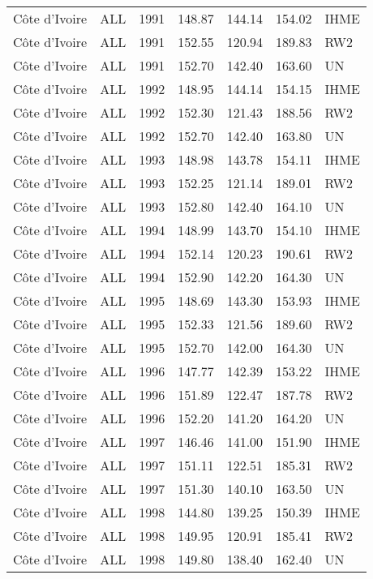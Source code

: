 \begin{longtable}{lllrrrl}
  C\^{o}te d'Ivoire & ALL & 1991 & 148.87 & 144.14 & 154.02 & IHME \\ 
  C\^{o}te d'Ivoire & ALL & 1991 & 152.55 & 120.94 & 189.83 & RW2 \\ 
  C\^{o}te d'Ivoire & ALL & 1991 & 152.70 & 142.40 & 163.60 & UN \\ 
  C\^{o}te d'Ivoire & ALL & 1992 & 148.95 & 144.14 & 154.15 & IHME \\ 
  C\^{o}te d'Ivoire & ALL & 1992 & 152.30 & 121.43 & 188.56 & RW2 \\ 
  C\^{o}te d'Ivoire & ALL & 1992 & 152.70 & 142.40 & 163.80 & UN \\ 
  C\^{o}te d'Ivoire & ALL & 1993 & 148.98 & 143.78 & 154.11 & IHME \\ 
  C\^{o}te d'Ivoire & ALL & 1993 & 152.25 & 121.14 & 189.01 & RW2 \\ 
  C\^{o}te d'Ivoire & ALL & 1993 & 152.80 & 142.40 & 164.10 & UN \\ 
  C\^{o}te d'Ivoire & ALL & 1994 & 148.99 & 143.70 & 154.10 & IHME \\ 
  C\^{o}te d'Ivoire & ALL & 1994 & 152.14 & 120.23 & 190.61 & RW2 \\ 
  C\^{o}te d'Ivoire & ALL & 1994 & 152.90 & 142.20 & 164.30 & UN \\ 
  C\^{o}te d'Ivoire & ALL & 1995 & 148.69 & 143.30 & 153.93 & IHME \\ 
  C\^{o}te d'Ivoire & ALL & 1995 & 152.33 & 121.56 & 189.60 & RW2 \\ 
  C\^{o}te d'Ivoire & ALL & 1995 & 152.70 & 142.00 & 164.30 & UN \\ 
  C\^{o}te d'Ivoire & ALL & 1996 & 147.77 & 142.39 & 153.22 & IHME \\ 
  C\^{o}te d'Ivoire & ALL & 1996 & 151.89 & 122.47 & 187.78 & RW2 \\ 
  C\^{o}te d'Ivoire & ALL & 1996 & 152.20 & 141.20 & 164.20 & UN \\ 
  C\^{o}te d'Ivoire & ALL & 1997 & 146.46 & 141.00 & 151.90 & IHME \\ 
  C\^{o}te d'Ivoire & ALL & 1997 & 151.11 & 122.51 & 185.31 & RW2 \\ 
  C\^{o}te d'Ivoire & ALL & 1997 & 151.30 & 140.10 & 163.50 & UN \\ 
  C\^{o}te d'Ivoire & ALL & 1998 & 144.80 & 139.25 & 150.39 & IHME \\ 
  C\^{o}te d'Ivoire & ALL & 1998 & 149.95 & 120.91 & 185.41 & RW2 \\ 
  C\^{o}te d'Ivoire & ALL & 1998 & 149.80 & 138.40 & 162.40 & UN \\ 

\end{longtable}
